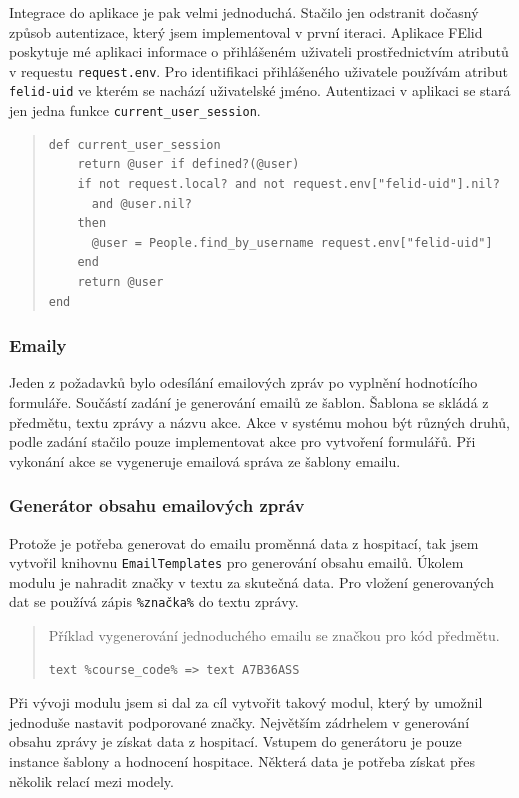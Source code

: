 Integrace do aplikace je pak velmi jednoduchá. Stačilo jen odstranit dočasný způsob autentizace, který jsem implementoval v první iteraci. Aplikace FElid poskytuje mé aplikaci informace o přihlášeném uživateli prostřednictvím atributů v requestu \verb|request.env|. Pro identifikaci přihlášeného uživatele používám atribut \verb|felid-uid| ve kterém se nachází uživatelské jméno. Autentizaci v aplikaci se stará jen jedna funkce \verb|current_user_session|.

\begin{quote}
\begin{verbatim}
def current_user_session
    return @user if defined?(@user)
    if not request.local? and not request.env["felid-uid"].nil? 
      and @user.nil? 
    then
      @user = People.find_by_username request.env["felid-uid"]
    end
    return @user
end
\end{verbatim} 
\end{quote}

\subsubsection{Emaily}
Jeden z požadavků bylo odesílání emailových zpráv po vyplnění hodnotícího formuláře. Součástí zadání je generování emailů ze šablon. Šablona se skládá z předmětu, textu zprávy a názvu akce. Akce v systému mohou být různých druhů, podle zadání stačilo pouze implementovat akce pro vytvoření formulářů. Při vykonání akce se vygeneruje emailová správa ze šablony emailu.

\subsubsection{Generátor obsahu emailových zpráv}
Protože je potřeba generovat do emailu proměnná data z hospitací, tak jsem vytvořil knihovnu \verb|EmailTemplates| pro generování obsahu emailů. Úkolem modulu je nahradit značky v textu za skutečná data. Pro vložení generovaných dat se používá zápis \verb|%značka%| do textu zprávy. 
\begin{quote}
Příklad vygenerování jednoduchého emailu se značkou pro kód předmětu.
\begin{verbatim}
text %course_code% => text A7B36ASS
\end{verbatim} 
\end{quote}

Při vývoji modulu jsem si dal za cíl vytvořit takový modul, který by umožnil jednoduše nastavit podporované značky. Největším zádrhelem v generování obsahu zprávy je získat data z hospitací. Vstupem do generátoru je pouze instance šablony a hodnocení hospitace. Některá data je potřeba získat přes několik relací mezi modely.

